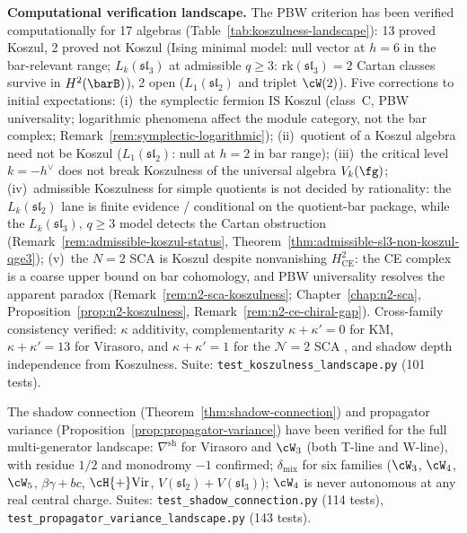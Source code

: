 \smallskip\noindent\textbf{Computational verification landscape.}
The PBW criterion has been verified computationally for 17 algebras
(Table~\ref{tab:koszulness-landscape}): 13 proved Koszul, 2 proved
not Koszul (Ising minimal model: null vector at $h = 6$ in the bar-relevant
range; $L_k(\mathfrak{sl}_3)$ at admissible $q \geq 3$:
$\mathrm{rk}(\mathfrak{sl}_3) = 2$ Cartan classes survive in
$H^2(\barB)$), 2 open ($L_1(\mathfrak{sl}_2)$ and triplet $\cW(2)$).
Five corrections to initial expectations:
(i)~the symplectic fermion IS Koszul (class~C, PBW universality;
logarithmic phenomena affect the module category, not the bar complex;
Remark~\ref{rem:symplectic-logarithmic});
(ii)~quotient of a Koszul algebra need not be Koszul
($L_1(\mathfrak{sl}_2)$: null at $h=2$ in bar range);
(iii)~the critical level $k = -h^\vee$ does not break Koszulness of the
universal algebra $V_k(\fg)$;
(iv)~admissible Koszulness for simple quotients is not decided by
rationality: the $L_k(\mathfrak{sl}_2)$ lane is finite evidence /
conditional on the quotient-bar package, while the
$L_k(\mathfrak{sl}_3)$, $q \geq 3$ model detects the Cartan obstruction
(Remark~\ref{rem:admissible-koszul-status},
Theorem~\ref{thm:admissible-sl3-non-koszul-qge3});
(v)~the $N{=}2$ SCA is Koszul despite nonvanishing
$H^2_{\mathrm{CE}}$: the CE complex is a coarse upper bound on
bar cohomology, and PBW universality resolves the apparent paradox
(Remark~\ref{rem:n2-sca-koszulness};
Chapter~\ref{chap:n2-sca},
Proposition~\ref{prop:n2-koszulness},
Remark~\ref{rem:n2-ce-chiral-gap}).
Cross-family consistency verified: $\kappa$ additivity, complementarity
$\kappa + \kappa' = 0$ for KM, $\kappa + \kappa' = 13$ for Virasoro,
and $\kappa + \kappa' = 1$ for the $\mathcal{N}{=}2$ SCA
, and
shadow depth independence from Koszulness.
Suite: \texttt{test\_koszulness\_landscape.py} (101 tests).

The shadow connection (Theorem~\ref{thm:shadow-connection})
and propagator variance
(Proposition~\ref{prop:propagator-variance})
have been verified for the full multi-generator landscape:
$\nabla^{\mathrm{sh}}$ for Virasoro and $\cW_3$ (both T-line and
W-line), with residue $1/2$ and monodromy $-1$ confirmed;
$\delta_{\mathrm{mix}}$ for six families ($\cW_3$, $\cW_4$, $\cW_5$,
$\beta\gamma{+}bc$, $\cH{+}\mathrm{Vir}$,
$V(\mathfrak{sl}_2){+}V(\mathfrak{sl}_3)$); $\cW_4$ is never
autonomous at any real central charge.
Suites: \texttt{test\_shadow\_connection.py} (114 tests),
\texttt{test\_propagator\_variance\_landscape.py} (143 tests).



